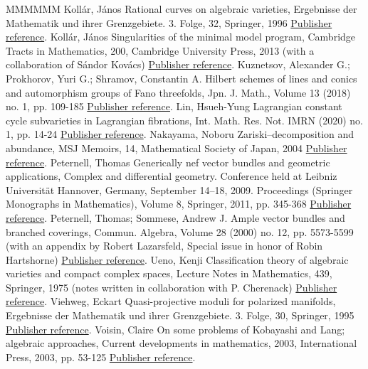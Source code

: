 \begin{thebibliography}{MMMMMM}
 Kollár, János Rational curves on algebraic varieties, Ergebnisse der Mathematik und ihrer Grenzgebiete. 3. Folge, 32, Springer, 1996 \href{https://ahl.centre-mersenne.org/item/AHL_2020__3__473_0/#Kol96}{Publisher reference}.
 Kollár, János Singularities of the minimal model program, Cambridge Tracts in Mathematics, 200, Cambridge University Press, 2013 (with a collaboration of Sándor Kovács) \href{https://ahl.centre-mersenne.org/item/AHL_2020__3__473_0/#Kol13}{Publisher reference}.
 Kuznetsov, Alexander G.; Prokhorov, Yuri G.; Shramov, Constantin A. Hilbert schemes of lines and conics and automorphism groups of Fano threefolds, Jpn. J. Math., Volume 13 (2018) no. 1, pp. 109-185 \href{https://ahl.centre-mersenne.org/item/AHL_2020__3__473_0/#KPS16}{Publisher reference}.
 Lin, Hsueh-Yung Lagrangian constant cycle subvarieties in Lagrangian fibrations, Int. Math. Res. Not. IMRN (2020) no. 1, pp. 14-24 \href{https://ahl.centre-mersenne.org/item/AHL_2020__3__473_0/#Lin15}{Publisher reference}.
 Nakayama, Noboru Zariski–decomposition and abundance, MSJ Memoirs, 14, Mathematical Society of Japan, 2004 \href{https://ahl.centre-mersenne.org/item/AHL_2020__3__473_0/#Nak04}{Publisher reference}.
 Peternell, Thomas Generically nef vector bundles and geometric applications, Complex and differential geometry. Conference held at Leibniz Universität Hannover, Germany, September 14–18, 2009. Proceedings (Springer Monographs in Mathematics), Volume 8, Springer, 2011, pp. 345-368 \href{https://ahl.centre-mersenne.org/item/AHL_2020__3__473_0/#Pe11}{Publisher reference}.
 Peternell, Thomas; Sommese, Andrew J. Ample vector bundles and branched coverings, Commun. Algebra, Volume 28 (2000) no. 12, pp. 5573-5599 (with an appendix by Robert Lazarsfeld, Special issue in honor of Robin Hartshorne) \href{https://ahl.centre-mersenne.org/item/AHL_2020__3__473_0/#PS00}{Publisher reference}.
 Ueno, Kenji Classification theory of algebraic varieties and compact complex spaces, Lecture Notes in Mathematics, 439, Springer, 1975 (notes written in collaboration with P. Cherenack) \href{https://ahl.centre-mersenne.org/item/AHL_2020__3__473_0/#Ue75}{Publisher reference}.
 Viehweg, Eckart Quasi-projective moduli for polarized manifolds, Ergebnisse der Mathematik und ihrer Grenzgebiete. 3. Folge, 30, Springer, 1995 \href{https://ahl.centre-mersenne.org/item/AHL_2020__3__473_0/#Vi95}{Publisher reference}.
 Voisin, Claire On some problems of Kobayashi and Lang; algebraic approaches, Current developments in mathematics, 2003, International Press, 2003, pp. 53-125 \href{https://ahl.centre-mersenne.org/item/AHL_2020__3__473_0/#Voi03}{Publisher reference}.
\end{thebibliography}
